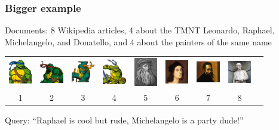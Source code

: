 \documentclass[mathserif]{beamer}
\def\red{\color[rgb]{0.8,0,0}}
\begin{document}
\begin{frame}[fragile]
\frametitle{Bigger example}

\smallskip
\smallskip
{\red Documents}: 8 Wikipedia articles, 4 about 
the TMNT Leonardo, Raphael, Michelangelo, and Donatello, and
4 about the painters of the same name

\begin{center}
\vspace{-20pt}
\begin{tabular}{ccccccccc} 
\hspace{-10pt}
\includegraphics[width=0.4in]{leo.jpg} & 
\includegraphics[width=0.4in]{rap.jpg} &
\includegraphics[width=0.4in]{mic.jpg} &
\includegraphics[width=0.4in]{don.jpg} &
\includegraphics[width=0.4in]{leo2.jpg} &
\includegraphics[width=0.4in]{rap2.jpg} &
\includegraphics[width=0.4in]{mic2.jpg} &
\includegraphics[width=0.4in]{don2.jpg} \\ 
1 & 2 & 3 & 4 & 5 & 6 & 7 & 8
\end{tabular}
\end{center}

\vspace{-5pt}
{\red Query}: ``Raphael is cool but rude, Michelangelo is a party dude!''


\end{frame}
\end{document}

